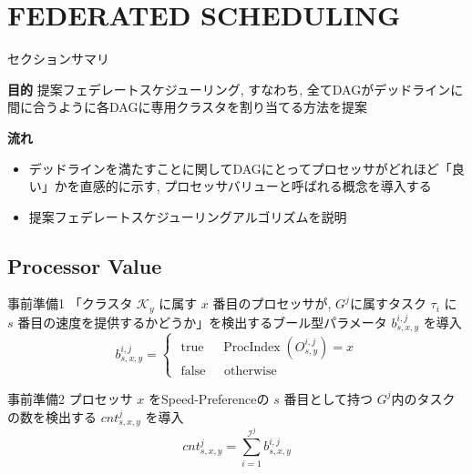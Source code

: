 
\section{FEDERATED SCHEDULING}
\label{sec: FEDERATED SCHEDULING}

\begin{frame}{セクションサマリ}
    \begin{itembox}[l]{\textbf{目的}}
        提案フェデレートスケジューリング, すなわち, 全てDAGがデッドラインに間に合うように各DAGに専用クラスタを割り当てる方法を提案
    \end{itembox}
    \begin{itembox}[l]{\textbf{流れ}}
        \setlength{\linewidth}{0.98\columnwidth}
        \begin{itemize}
            \item デッドラインを満たすことに関してDAGにとってプロセッサがどれほど「良い」かを直感的に示す, プロセッサバリューと呼ばれる概念を導入する
            \item 提案フェデレートスケジューリングアルゴリズムを説明
        \end{itemize}
    \end{itembox}
\end{frame}


\subsection{Processor Value}
\label{ssec: Processor Value}

\begin{frame}{事前準備1}
    「クラスタ $\mathcal{K}_y$ に属す $x$ 番目のプロセッサが, $G^j$に属すタスク $\tau_i$ に $s$ 番目の速度を提供するかどうか」を検出するブール型パラメータ $b_{s,x,y}^{i,j}$ を導入
    \begin{equation*}
        b_{s, x, y}^{i, j}= \begin{cases}\text { true } & \operatorname{ProcIndex}\left(O_{s, y}^{i, j}\right)=x \\ \text { false } & \text { otherwise }\end{cases}
    \end{equation*}
\end{frame}

\begin{frame}{事前準備2}
    プロセッサ $x$ をSpeed-Preferenceの $s$ 番目として持つ $G^j$内のタスクの数を検出する $cnt_{s,x,y}^j$ を導入
    \begin{equation*}
        c n t_{s, x, y}^j=\sum_{i=1}^{\mathcal{I}^j} b_{s, x, y}^{i, j}
    \end{equation*}
\end{frame}

